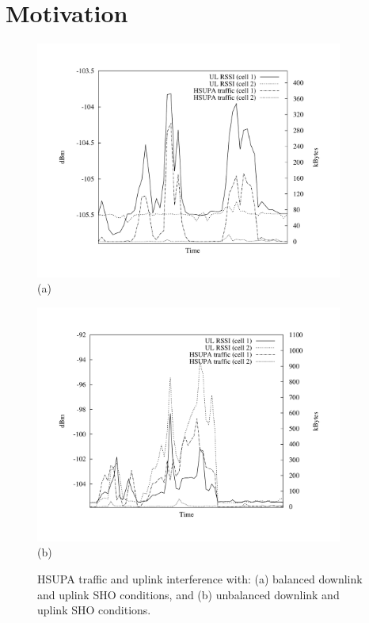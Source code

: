 \clearpage{}


\section{Motivation \label{sec:07-Motivation}}

\begin{figure}
\centering

\includegraphics[width=0.9\textwidth]{07-experimental_evaluation-sho_balancing/img/network_normal}\\\vskip -0.3in(a)

\includegraphics[width=0.9\textwidth]{07-experimental_evaluation-sho_balancing/img/network_problem}\\\vskip -0.3in(b)

\caption{HSUPA traffic and uplink interference with: (a) balanced downlink
and uplink SHO conditions, and (b) unbalanced downlink and uplink
SHO conditions.\label{fig:07-Problem_illustration}}
\end{figure}


